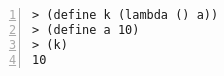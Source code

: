 \begin{center}

\begin{minipage}{0.4\textwidth}
\begin{lstlisting}[language=racket,
                basicstyle=\ttfamily\footnotesize,
                numbers=left, xleftmargin=2em]
> (define k (lambda () a))
> (define a 10)
> (k)
10
\end{lstlisting}
\end{minipage}
\end{center}

